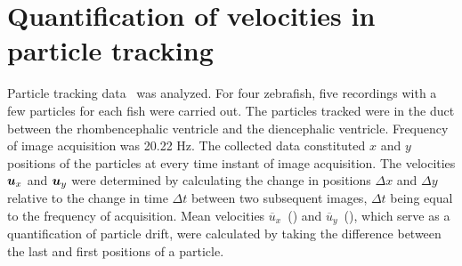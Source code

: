 \documentclass{WileyMSP-template}
\begin{document}
\section{Quantification of velocities in particle tracking}\label{sec:appC_particle_transport}
Particle tracking data~\cite{Olstad2019CiliaryDevelopment} was analyzed.
For four zebrafish, five recordings with a few particles for each fish were carried out.
The particles tracked were in the duct between the rhombencephalic ventricle and the
diencephalic ventricle. Frequency of image acquisition was 20.22 Hz.
The collected data constituted $x$ and $y$ positions of the particles at every time
instant of image acquisition. The velocities $\bm{u}_x$ and $\bm{u}_y$ were determined by
calculating the change in positions $\Delta x$ and $\Delta y$ relative to the change
in time $\Delta t$ between two subsequent images, $\Delta t$ being equal to the
frequency of acquisition.
Mean velocities $\overline{u}_x$~() and
$\overline{u}_y$~(),
which serve as a quantification of particle drift, were calculated
by taking the difference between the last and first positions of a particle.
\end{document}
